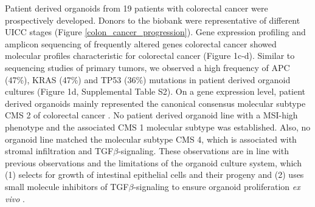 \begin{flushleft}
Patient derived organoids from 19 patients with colorectal cancer were prospectively developed. Donors to the biobank were representative of different UICC stages (Figure \ref{colon_cancer_progression}). Gene expression profiling and amplicon sequencing of frequently altered genes colorectal cancer showed molecular profiles characteristic for colorectal cancer (Figure 1c-d). Similar to sequencing studies of primary tumors, we observed a high frequency of APC (47\%), KRAS (47\%) and TP53 (36\%) mutations in patient derived organoid cultures \cite{Muzny2012-hr} (Figure 1d, Supplemental Table S2). On a gene expression level, patient derived organoids mainly represented the canonical consensus molecular subtype CMS 2 of colorectal cancer \cite{Guinney2015-ex}. No patient derived organoid line with a MSI-high phenotype and the associated CMS 1 molecular subtype was established. Also, no organoid line matched the molecular subtype CMS 4, which is associated with stromal infiltration and TGF\(\beta\)-signaling. These observations are in line with previous observations \cite{Van_De_Wetering2015-ko, Schutte2017-fl} and the limitations of the organoid culture system, which (1) selects for growth of intestinal epithelial cells and their progeny and (2) uses small molecule inhibitors of TGF\(\beta\)-signaling to ensure organoid proliferation \textit{ex vivo} \cite{Sato2011-lh}.

\end{flushleft}
